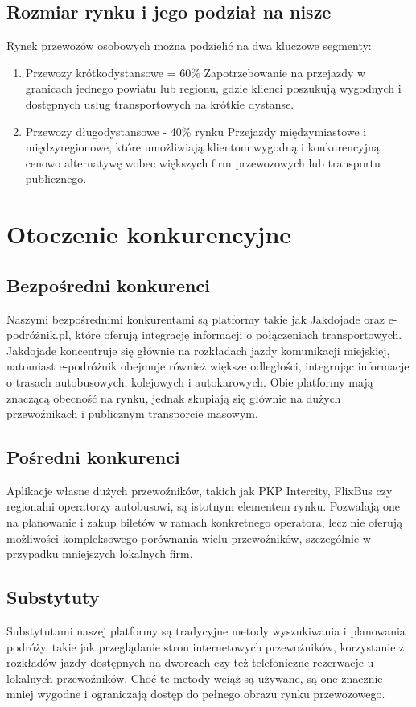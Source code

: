 \subsection{Rozmiar rynku i jego podział na nisze}
    Rynek przewozów osobowych można podzielić na dwa kluczowe segmenty:
    \begin{enumerate}
        \item Przewozy krótkodystansowe = 60\%
            Zapotrzebowanie na przejazdy w granicach jednego powiatu lub regionu, gdzie klienci poszukują wygodnych i dostępnych usług transportowych na krótkie dystanse.
        \item Przewozy długodystansowe - 40\% rynku
            Przejazdy międzymiastowe i międzyregionowe, które umożliwiają klientom wygodną i konkurencyjną cenowo alternatywę wobec większych firm przewozowych lub transportu publicznego.
    \end{enumerate}

    
\section{Otoczenie konkurencyjne}

    \subsection{Bezpośredni konkurenci}
    Naszymi bezpośrednimi konkurentami są platformy takie jak Jakdojade oraz e-podróżnik.pl, które oferują integrację informacji o połączeniach transportowych. Jakdojade koncentruje się głównie na rozkładach jazdy komunikacji miejskiej, natomiast e-podróżnik obejmuje również większe odległości, integrując informacje o trasach autobusowych, kolejowych i autokarowych. Obie platformy mają znaczącą obecność na rynku, jednak skupiają się głównie na dużych przewoźnikach i publicznym transporcie masowym.

    \subsection{Pośredni konkurenci}
    Aplikacje własne dużych przewoźników, takich jak PKP Intercity, FlixBus czy regionalni operatorzy autobusowi, są istotnym elementem rynku. Pozwalają one na planowanie i zakup biletów w ramach konkretnego operatora, lecz nie oferują możliwości kompleksowego porównania wielu przewoźników, szczególnie w przypadku mniejszych lokalnych firm.

    \subsection{Substytuty}
    Substytutami naszej platformy są tradycyjne metody wyszukiwania i planowania podróży, takie jak przeglądanie stron internetowych przewoźników, korzystanie z rozkładów jazdy dostępnych na dworcach czy też telefoniczne rezerwacje u lokalnych przewoźników. Choć te metody wciąż są używane, są one znacznie mniej wygodne i ograniczają dostęp do pełnego obrazu rynku przewozowego.

